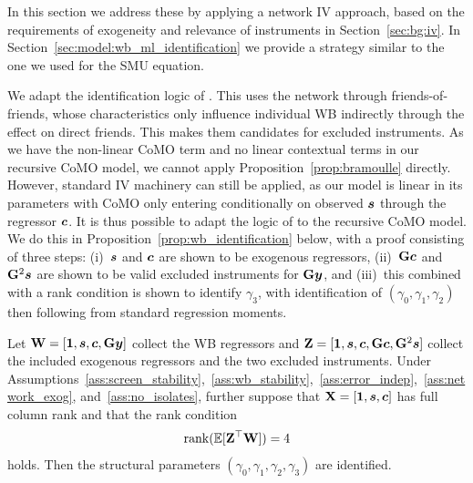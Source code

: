 In this section we address these by applying a network IV approach, based on the requirements of exogeneity and relevance of instruments in Section~\ref{sec:bg:iv}. In Section~\ref{sec:model:wb_ml_identification} we provide a strategy similar to the one we used for the SMU equation.

We adapt the identification logic of \textcite{Bramoulle2009}. This uses the network through friends-of-friends, whose characteristics only influence individual WB indirectly through the effect on direct friends. This makes them candidates for excluded instruments. As we have the non-linear CoMO term and no linear contextual terms in our recursive CoMO model, we cannot apply Proposition~\ref{prop:bramoulle} directly. However, standard IV machinery can still be applied, as our model is linear in its parameters with CoMO only entering conditionally on observed $\bm{s}$ through the regressor $\bm{c}$. It is thus possible to adapt the logic of \textcite{Bramoulle2009} to the recursive CoMO model. We do this in Proposition~\ref{prop:wb_identification} below, with a proof consisting of three steps: (i)~$\bm{s}$ and $\bm{c}$ are shown to be exogenous regressors, (ii)~$\mathbf{G}\bm{c}$ and $\mathbf{G}^2\bm{s}$ are shown to be valid excluded instruments for $\mathbf{G}\bm{y}$, and (iii)~this combined with a rank condition is shown to identify $\gamma_3$, with identification of $(\gamma_0, \gamma_1, \gamma_2)$ then following from standard regression moments.

\begin{proposition}
\label{prop:wb_identification}
Let $\mathbf{W} = [\bm{1}, \bm{s}, \bm{c}, \mathbf{G}\bm{y}]$ collect the WB regressors and $\mathbf{Z} = [\bm{1}, \bm{s}, \bm{c}, \mathbf{G}\bm{c}, \mathbf{G}^2\bm{s}]$ collect the included exogenous regressors and the two excluded instruments. Under Assumptions~\ref{ass:screen_stability},~\ref{ass:wb_stability},~\ref{ass:error_indep},~\ref{ass:network_exog}, and~\ref{ass:no_isolates}, further suppose that $\mathbf{X} = [\bm{1}, \bm{s}, \bm{c}]$ has full column rank and that the rank condition
\[
    \operatorname{rank}(\mathbb{E}[\mathbf{Z}^\top\mathbf{W}]) = 4
\]
holds. Then the structural parameters $(\gamma_0, \gamma_1, \gamma_2, \gamma_3)$ are identified.
\end{proposition}

